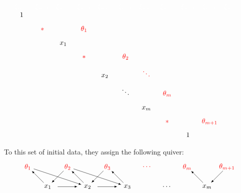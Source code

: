 \documentclass[pdftex]{sigma}
\numberwithin{equation}{section}
\newcommand{\s}[1]{{\color{red}#1}}
\begin{document}
\begin{center}
\(\quad\displaystyle \begin{array}{cccccccccccccccccc}
{\color{white}\xi_{n+1}}&{\color{white}\xi_{n+1}}&{\color{white}\xi_{n+1}}&{\color{white}\xi_{n+1}}&{\color{white}\xi_{n+1}}&{\color{white}\xi_{n+1}}&{\color{white}\xi_{n+1}}&{\color{white}\xi_{n+1}}&{\color{white}\xi_{n+1}}&{\color{white}\xi_{n+1}}&{\color{white}\xi_{n+1}}
\\
1&&&&\\[8pt]
&{\color{red}*}&&\s{\theta_1}&&\\[8pt]
&&x_1&&&&\\[8pt]
&&&{\color{red}*}&&\s{\theta_2}&&\\[8pt]
&&&&x_2&&\s{\ddots} &&\\[8pt]
&&&&&\ddots &&\s{\theta_m}&&\\[8pt]
&&&&&&x_m&&&&\\[8pt]
&&&&&&&{\color{red}*}&&\s{\theta_{m+1}}&&\\[8pt]
&&&&&&&&1&&&&
\end{array}
\)
\end{center}
To this set of initial data, they assign the following quiver:
$$
\begin{tikzpicture}
 \draw (0,0) node {$x_1$};
 \draw (2,0) node {$x_2$};
 \draw (4,0) node {$x_3$};
 \draw (6,0) node {$\cdots$};
 \draw (8,0) node {$x_m$};
 \draw[-latex] (0.5,0) -- (1.5,0);
 \draw[-latex] (2.5,0) -- (3.5,0);
 \draw (-1,1) node {\color{red}$\theta_1$};
 \draw (1, 1) node {\color{red}$\theta_2$};
 \draw (3, 1) node {\color{red}$\theta_3$};
 \draw (5, 1) node {\color{red}$\cdots$};
 \draw (7, 1) node {\color{red}$\theta_m$};
 \draw (9, 1) node {\color{red}$\theta_{m+1}$};
 \draw[-latex] (0.8,0.8) -- (0.2,0.2);
 \draw[-latex] (-0.2,0.2) -- (-0.8,0.8);
 \draw[-latex] (2.8,0.8) -- (2.2,0.2);
 \draw[-latex] (1.8,0.2) -- (1.2,0.8);
 \draw[-latex] (3.8,0.2) -- (3.2,0.8);
 \draw[-latex] (8.8,0.8) -- (8.2,0.2);
 \draw[-latex] (7.8,0.2) -- (7.2,0.8);
 \draw[-latex] (-0.7,0.9) -- (1.7,0.1);
 \draw[-latex] (1.3, 0.9) -- (3.7,0.1);
\end{tikzpicture}
$$
\end{document}
